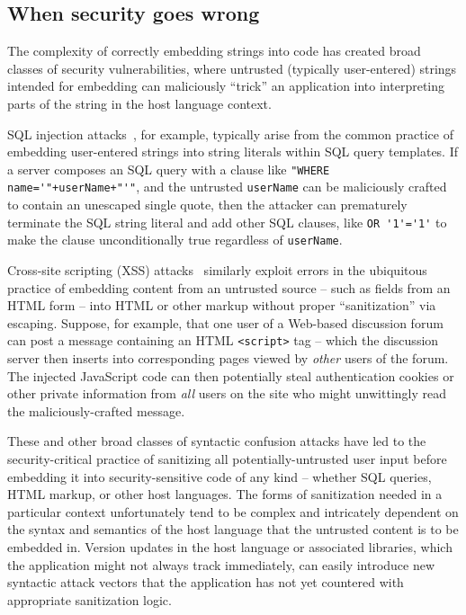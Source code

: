 \subsection{When security goes wrong}
\label{sec:bg:security}

The complexity of correctly embedding strings into code
has created broad classes of security vulnerabilities,
where untrusted (typically user-entered) strings intended for embedding
can maliciously ``trick'' an application into interpreting parts of the string
in the host language context.

SQL injection attacks~\cite{clarke12sql}, for example,
typically arise from the common practice
of embedding user-entered strings into string literals
within SQL query templates.
If a server composes an SQL query with a clause like
\verb|"WHERE name='"+userName+"'"|, 
and the untrusted \verb|userName| can be maliciously crafted
to contain an unescaped single quote,
then the attacker can prematurely terminate the SQL string literal
and add other SQL clauses, like \verb|OR '1'='1'|
to make the clause unconditionally true regardless of \verb|userName|.

Cross-site scripting (XSS) attacks~\cite{fogie07xss}
similarly exploit errors in the ubiquitous practice
of embedding content from an untrusted source --
such as fields from an HTML form --
into HTML or other markup without proper ``sanitization'' via escaping.
Suppose, for example, that one user of a Web-based discussion forum
can post a message containing an HTML \verb|<script>| tag --
which the discussion server then inserts into corresponding pages
viewed by \emph{other} users of the forum.
The injected JavaScript code can then potentially steal
authentication cookies or other private information
from \emph{all} users on the site
who might unwittingly read the maliciously-crafted message.

These and other broad classes of syntactic confusion attacks
have led to the security-critical practice
of sanitizing all potentially-untrusted user input
before embedding it into security-sensitive code of any kind --
whether SQL queries, HTML markup, or other host languages.
The forms of sanitization needed in a particular context
unfortunately tend to be complex and intricately dependent on
the syntax and semantics of the host language
that the untrusted content is to be embedded in.
Version updates in the host language or associated libraries,
which the application might not always track immediately,
can easily introduce new syntactic attack vectors
that the application
has not yet countered with appropriate sanitization logic.

